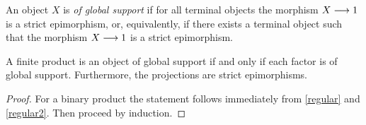 \begin{definition} \label{globally supported}
An object $X$ is \emph{of global support} if for all terminal objects the morphism $X \overset {} {\longrightarrow} 1$ is a strict epimorphism, or, equivalently, if there exists a terminal object such that the morphism $X \overset {} {\longrightarrow} 1$ is a strict epimorphism.
\end{definition}

\begin{proposition}
A finite product is an object of global support if and only if each factor is of global support. Furthermore, the projections are strict epimorphisms.
\end{proposition}
\begin{proof}
For a binary product the statement follows immediately from 
\ref{regular} and \ref{regular2}. Then proceed by induction.
\end{proof}






